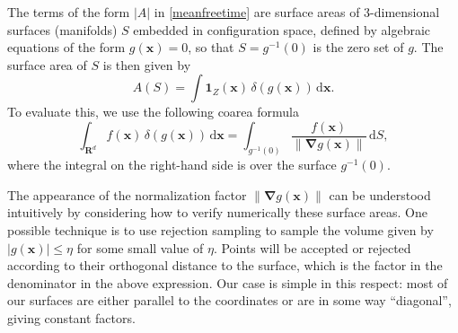 \documentclass[superscriptaddress,pre,reprint,showpacs,twocolumn]{revtex4-1}
\newcommand{\indicatorsymbol}{\mathbf{1}}
\begin{document}
The terms of the form $|A|$ in \eqref{meanfreetime} are surface areas of 3-dimensional surfaces (manifolds) $S$ embedded in  configuration space,
defined by algebraic equations of the form $g(\mathbf{x}) = 0$, so that $S = g^{-1}(0)$ is the zero set of $g$.
The surface area of $S$ is then given by
\begin{equation}
A(S) = \int \indicatorsymbol_Z(\mathbf{x}) \, \delta(g(\mathbf{x})) \, \mathrm{d} \mathbf{x}.
\label{eq:surface-area}
\end{equation}
To evaluate this, we use the following coarea formula
\cite[section 6.1]{Hormander83} 
\begin{equation}
\int_{\mathbf{R}^d} f(\mathbf{x}) \, \delta(g(\mathbf{x})) \, \mathrm{d} \mathbf{x} = \int_{g^{-1}(0)}\frac{f(\mathbf{x})}{\| \mathbf{\nabla}g(\mathbf{x}) \|} \, \mathrm{d}S,
\label{eq:surface-dirac}
\end{equation}
where the integral on the right-hand side is over the surface $g^{-1}(0)$.
\cite{Zappa2018}


The appearance of the normalization factor $\| \mathbf{\nabla}g(\mathbf{x}) \|$ can be understood intuitively by considering how to verify numerically these surface areas. One possible technique is to use rejection sampling to sample the volume given by $|g(\mathbf{x})| \le \eta$ for some small value of $\eta$. Points will be accepted or rejected according to their orthogonal distance to the surface, which is the factor in the denominator in the above expression. Our case is simple in this respect: most of our surfaces are either parallel to the coordinates or are in some way ``diagonal'', giving constant factors.


\end{document}
